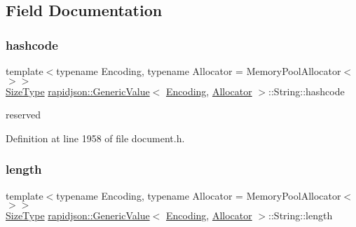 \subsection{Field Documentation}
\mbox{\label{structrapidjson_1_1_generic_value_1_1_string_ad152cf5021ffbcaa8dcafea401ac5260}} 
\subsubsection{\texorpdfstring{hashcode}{hashcode}}
{\footnotesize\ttfamily template$<$typename Encoding, typename Allocator = Memory\+Pool\+Allocator$<$$>$$>$ \\
\mbox{\hyperlink{namespacerapidjson_a44eb33eaa523e36d466b1ced64b85c84}{Size\+Type}} \mbox{\hyperlink{classrapidjson_1_1_generic_value}{rapidjson\+::\+Generic\+Value}}$<$ \mbox{\hyperlink{classrapidjson_1_1_encoding}{Encoding}}, \mbox{\hyperlink{classrapidjson_1_1_allocator}{Allocator}} $>$\+::String\+::hashcode}



reserved 



Definition at line 1958 of file document.\+h.

\mbox{\label{structrapidjson_1_1_generic_value_1_1_string_a6f4161f0e7c64602cd882552e1081946}} 
\subsubsection{\texorpdfstring{length}{length}}
{\footnotesize\ttfamily template$<$typename Encoding, typename Allocator = Memory\+Pool\+Allocator$<$$>$$>$ \\
\mbox{\hyperlink{namespacerapidjson_a44eb33eaa523e36d466b1ced64b85c84}{Size\+Type}} \mbox{\hyperlink{classrapidjson_1_1_generic_value}{rapidjson\+::\+Generic\+Value}}$<$ \mbox{\hyperlink{classrapidjson_1_1_encoding}{Encoding}}, \mbox{\hyperlink{classrapidjson_1_1_allocator}{Allocator}} $>$\+::String\+::length}



